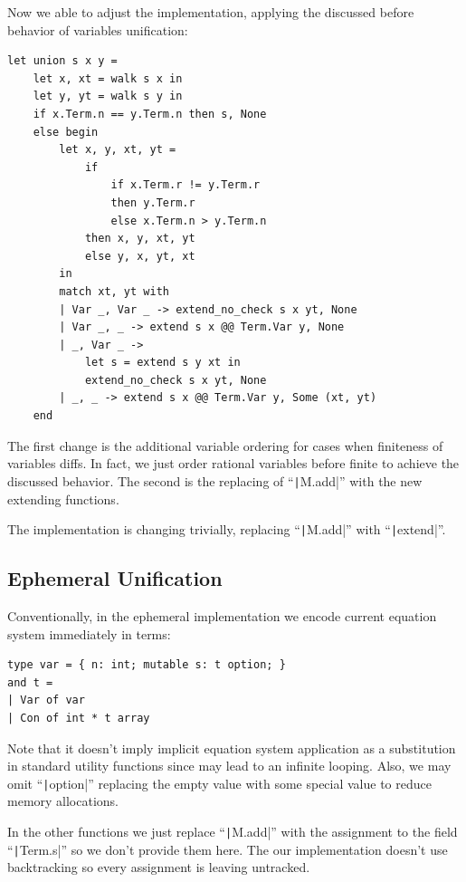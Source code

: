 Now we able to adjust the \union implementation, applying the discussed before behavior of variables unification:
\begin{verbatim}
let union s x y =
    let x, xt = walk s x in
    let y, yt = walk s y in
    if x.Term.n == y.Term.n then s, None
    else begin
        let x, y, xt, yt =
            if
                if x.Term.r != y.Term.r
                then y.Term.r
                else x.Term.n > y.Term.n
            then x, y, xt, yt
            else y, x, yt, xt
        in
        match xt, yt with
        | Var _, Var _ -> extend_no_check s x yt, None
        | Var _, _ -> extend s x @@ Term.Var y, None
        | _, Var _ ->
            let s = extend s y xt in
            extend_no_check s x yt, None
        | _, _ -> extend s x @@ Term.Var y, Some (xt, yt)
    end
\end{verbatim}

The first change is the additional variable ordering for cases when finiteness of variables diffs. In fact, we just order rational variables before finite to achieve the discussed behavior. The second is the replacing of ``\texttt|M.add|'' with the new extending functions.

The \unify implementation is changing trivially, replacing ``\texttt|M.add|'' with ``\texttt|extend|''.


\subsection{Ephemeral Unification}

Conventionally, in the ephemeral implementation we encode current equation system immediately in terms:
\begin{verbatim}
type var = { n: int; mutable s: t option; }
and t =
| Var of var
| Con of int * t array
\end{verbatim}

Note that it doesn't imply implicit equation system application as a substitution in standard utility functions since may lead to an infinite looping. Also, we may omit ``\texttt|option|'' replacing the empty value with some special value to reduce memory allocations.

In the other functions we just replace ``\texttt|M.add|'' with the assignment to the field ``\texttt|Term.s|'' so we don't provide them here. The our implementation doesn't use backtracking so every assignment is leaving untracked.
